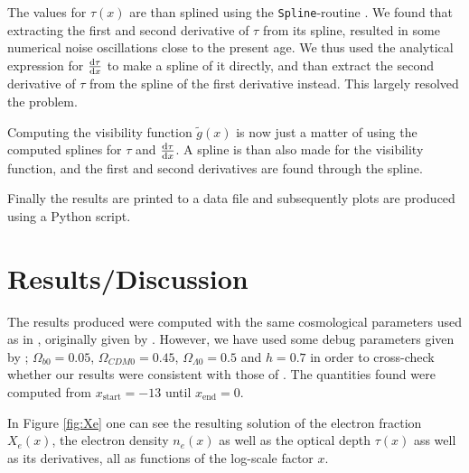 \documentclass[twocolumn]{aastex62}
\begin{document}
The values for $\tau(x)$ are than splined using the \texttt{Spline}-routine \citep[]{winther:2020}. We found that extracting the first and second derivative of $\tau$ from its spline, resulted in some numerical noise oscillations close to the present age. We thus used the analytical expression for $\dv{\tau}{x}$ to make a spline of it directly, and than extract the second derivative of $\tau$ from the spline of the first derivative instead. This largely resolved the problem. 

Computing the visibility function $\tilde{g}(x)$ is now just a matter of using the computed splines for $\tau$ and $\dv{\tau}{x}$. A spline is than also made for the visibility function, and the first and second derivatives are found through the spline. 

Finally the results are printed to a data file and subsequently plots are produced using a Python script.

\section{Results/Discussion}\label{sec:Results}
The results produced were computed with the same cosmological parameters used as in \cite{stutzer:2020}, originally given by \cite{callin:2006}. However, we have used some debug parameters given by \cite{winther:2020}; $\Omega_{b0} = 0.05$, $\Omega_{CDM0} = 0.45$, $\Omega_{\Lambda 0} = 0.5$ and $h = 0.7$ in order to cross-check whether our results were consistent with those of \cite{winther:2020}. The quantities found were computed from $x_\text{start} = -13$ until $x_\text{end} = 0$.

In Figure \ref{fig:Xe} one can see the resulting solution of the electron fraction $X_e(x)$, the electron density $n_e(x)$ as well as the optical depth $\tau(x)$ ass well as its derivatives, all as functions of the log-scale factor $x$. 
\end{document}
